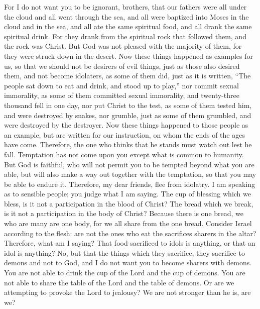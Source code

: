 \begin{biblechapter} %
 For I do not want you to be ignorant, brothers, that our fathers were all under the cloud and all went through the sea,
\verse and all were baptized into Moses in the cloud and in the sea,
\verse and all ate the same spiritual food,
\verse and all drank the same spiritual drink. For they drank from the spiritual rock that followed them, and the rock was Christ.
\verse But God was not pleased with the majority of them, for they were struck down in the desert.
\verse Now these things happened as examples for us, so that we should not be desirers of evil things, just as those also desired them,
\verse and not become idolaters, as some of them did, just as it is written, “The people sat down to eat and drink, and stood up to play,”
\verse nor commit sexual immorality, as some of them committed sexual immorality, and twenty-three thousand fell in one day,
\verse nor put Christ to the test, as some of them tested him, and were destroyed by snakes,
\verse nor grumble, just as some of them grumbled, and were destroyed by the destroyer.
\verse Now these things happened to those people as an example, but are written for our instruction, on whom the ends of the ages have come.
\verse Therefore, the one who thinks that he stands must watch out lest he fall.
\verse Temptation has not come upon you except what is common to humanity. But God is faithful, who will not permit you to be tempted beyond what you are able, but will also make a way out together with the temptation, so that you may be able to endure it.
 Therefore, my dear friends, flee from idolatry.
\verse I am speaking as to sensible people; you judge what I am saying.
\verse The cup of blessing which we bless, is it not a participation in the blood of Christ? The bread which we break, is it not a participation in the body of Christ?
\verse Because there is one bread, we who are many are one body, for we all share from the one bread.
\verse Consider Israel according to the flesh: are not the ones who eat the sacrifices sharers in the altar?
\verse Therefore, what am I saying? That food sacrificed to idols is anything, or that an idol is anything?
\verse No, but that the things which they sacrifice, they sacrifice to demons and not to God, and I do not want you to become sharers with demons.
\verse You are not able to drink the cup of the Lord and the cup of demons. You are not able to share the table of the Lord and the table of demons.
\verse Or are we attempting to provoke the Lord to jealousy? We are not stronger than he is, are we?

\end{biblechapter}
